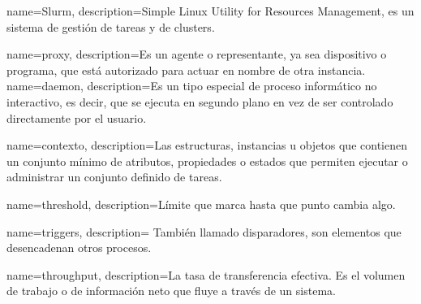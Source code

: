 {
  name={Slurm},
  description={Simple Linux Utility for Resources Management, es un sistema de gestión de tareas y de clusters\cite{Slurm}.}
}

{
  name={proxy},
  description={Es un agente o representante, ya sea dispositivo o programa, que está autorizado para actuar en nombre de otra instancia.}
}
{
  name={daemon},
  description={Es un tipo especial de proceso informático no interactivo, es decir, que se ejecuta en segundo plano en vez de ser controlado directamente por el usuario.}
}

{
  name={contexto},
  description={Las estructuras, instancias u objetos que contienen un conjunto mínimo de atributos, propiedades o estados que permiten ejecutar o administrar un conjunto definido de tareas.}
}

{
  name={threshold},
  description={Límite que marca hasta que punto cambia algo.}
}

{
  name={triggers},
  description= {También llamado disparadores, son elementos que desencadenan otros procesos.}
}

{
  name={throughput},
  description={La tasa de transferencia efectiva. Es el volumen de trabajo o de información neto que fluye a través de un sistema.}
}


